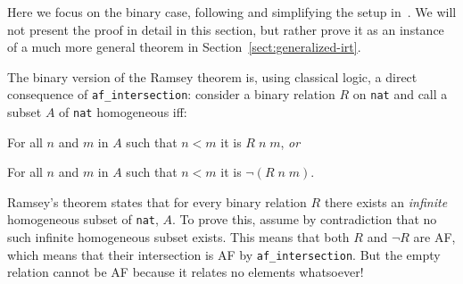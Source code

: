\documentclass{llncs}
\begin{document}
Here we focus on the binary case, following and simplifying the setup 
in~\cite{Veldman01041993,coquand-short}. We will not present the proof in detail in this section, 
but rather prove it as an instance of a much more general theorem in Section~\ref{sect:generalized-irt}.

%
%
%
%

The binary version of the Ramsey theorem is, using classical logic, a direct consequence of \lstinline|af_intersection|: 
consider a binary relation $R$ on \lstinline|nat| and call a subset $A$ of \lstinline|nat| homogeneous iff:
\begin{itemize*} 
   \item For all $n$ and $m$ in $A$ such that $n < m$ it is $R\;n\;m$, {\em or} 
   \item For all $n$ and $m$ in $A$ such that $n < m$ it is $\lnot(R\;n\;m)$.
\end{itemize*}
Ramsey's theorem states that for every binary relation $R$ there exists 
an {\em infinite} homogeneous subset of \lstinline|nat|, $A$. To prove this, assume by 
contradiction that no such infinite homogeneous subset exists. This means that both $R$ and $\lnot R$ are AF, which 
means that their intersection is AF by \lstinline|af_intersection|. But the empty relation 
cannot be AF because it relates no elements whatsoever! 
\end{document}
